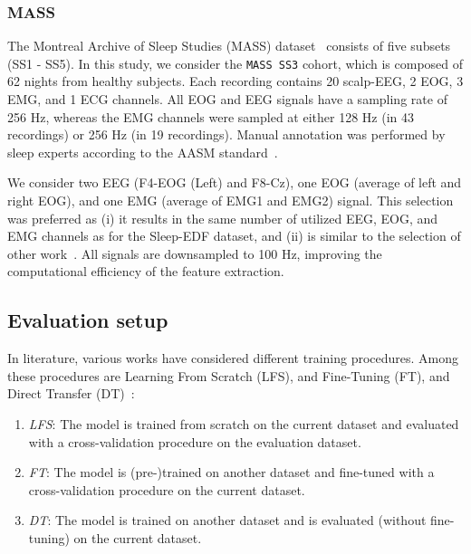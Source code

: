 \documentclass[runningheads]{llncs}
\begin{document}
\subsubsection{MASS}
The Montreal Archive of Sleep Studies (MASS) dataset~\cite{o2014montrealmass} consists of five subsets (SS1 - SS5). In this study, we consider the \texttt{MASS SS3} cohort, which is composed of 62 nights from healthy subjects. Each recording contains 20 scalp-EEG, 2 EOG, 3 EMG, and 1 ECG channels. All EOG and EEG signals have a sampling rate of 256 Hz, whereas the EMG channels were sampled at either 128 Hz (in 43 recordings) or 256 Hz (in 19 recordings). 
Manual annotation was performed by sleep experts according to the AASM standard~\cite{berry2012rules}.

We consider two EEG (F4-EOG (Left) and F8-Cz), one EOG (average of left and right EOG), and one EMG (average of EMG1 and EMG2) signal. This selection was preferred as (i) it results in the same number of utilized EEG, EOG, and EMG channels as for the Sleep-EDF dataset, and (ii) is similar to the selection of other work~\cite{guillot2020dreem__simplesleepnet,supratak2020tinysleepnet,supratak2017deepsleepnet,seo2020iitnet}. All signals are downsampled to 100 Hz, improving the computational efficiency of the feature extraction. 


\subsection{Evaluation setup}
In literature, various works have considered different training procedures. Among these procedures are Learning From Scratch (LFS), and Fine-Tuning (FT), and Direct Transfer (DT)~\cite{guillot2021robustsleepnet}: 

\begin{enumerate}
    \item \textit{LFS}: The model is trained from scratch on the current dataset and evaluated with a cross-validation procedure on the evaluation dataset. 
    \item \textit{FT}: The model is (pre-)trained on another dataset and fine-tuned with a cross-validation procedure on the current dataset. 
    \item \textit{DT}: The model is trained on another dataset and is evaluated (without fine-tuning) on the current dataset.
\end{enumerate}
\end{document}
